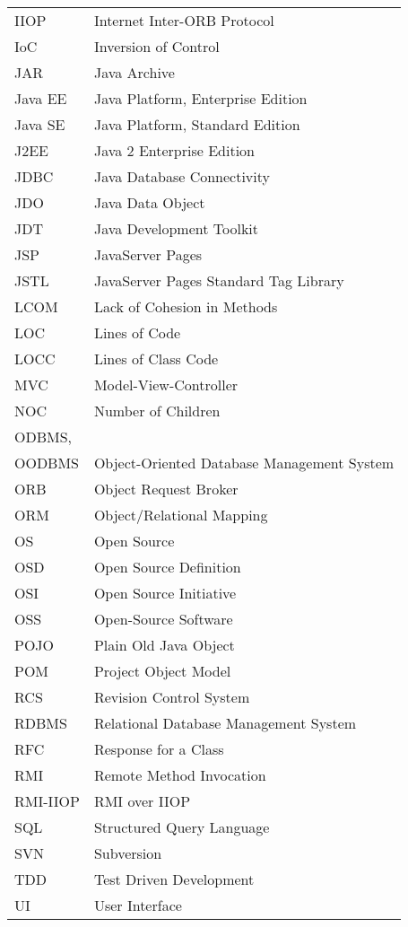 {\begin{longtable}[!h]{@{}p{1.8cm}p{11cm}}
    IIOP & Internet Inter-ORB Protocol\\
    IoC & Inversion of Control\\
    JAR & Java Archive\\
    Java EE & Java Platform, Enterprise Edition\\
    Java SE & Java Platform, Standard Edition\\
    J2EE & Java 2 Enterprise Edition\\
    JDBC & Java Database Connectivity\\
    JDO & Java Data Object\\
    JDT & Java Development Toolkit\\
    JSP & JavaServer Pages\\
    JSTL & JavaServer Pages Standard Tag Library\\
    LCOM & Lack of Cohesion in Methods\\
    LOC & Lines of Code\\
    LOCC & Lines of Class Code\\
    MVC & Model-View-Controller\\
    NOC & Number of Children\\
    ODBMS, & \\*
    OODBMS & Object-Oriented Database Management System\\
    ORB & Object Request Broker\\
    ORM & Object/Relational Mapping\\
    OS & Open Source\\
    OSD & Open Source Definition\\
    OSI & Open Source Initiative\\
    OSS & Open-Source Software\\
    POJO & Plain Old Java Object\\
    POM & Project Object Model\\
    RCS & Revision Control System\\
    RDBMS & Relational Database Management System\\
    RFC & Response for a Class\\
    RMI & Remote Method Invocation\\
    RMI-IIOP & RMI over IIOP\\
    SQL & Structured Query Language\\
    SVN & Subversion\\
    TDD & Test Driven Development\\
    UI & User Interface\\

\end{longtable}}
